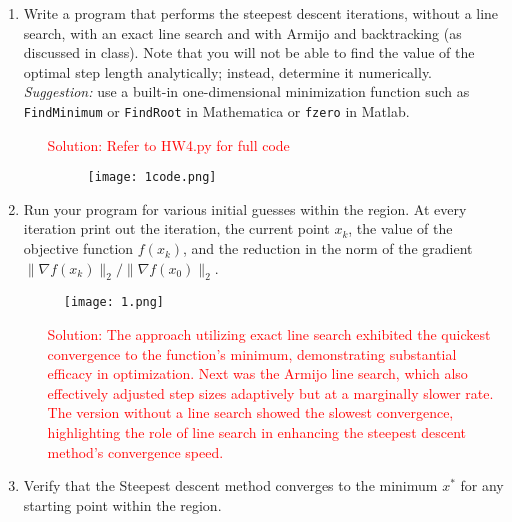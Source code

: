 \documentclass[11pt]{article}
\begin{document}
\begin{enumerate}
  
\item Write a program that performs the steepest descent iterations,
  without a line search, with an exact line search and with Armijo and
  backtracking (as discussed in class).  Note that you will not be
  able to find the value of the optimal step length analytically;
  instead, determine it numerically. {\em Suggestion:} use a built-in
  one-dimensional minimization function such as {\tt FindMinimum} or
  {\tt FindRoot} in {\sc Mathematica} or {\tt fzero} in {\sc Matlab}.



\begin{enumerate}
\item[\textcolor{red}{Solution:}]
\textcolor{red}{
Refer to HW4.py for full code
}

\begin{figure}[H]
\centering
\texttt{[image: 1code.png]} 
\end{figure}

\end{enumerate}






  
\item Run your program for various initial guesses within the region.
  At every iteration print out the
  iteration, the current point $x_k$, the value of the objective
  function $f(x_k)$, and the reduction in the norm of the gradient $ \|\nabla
  f(x_k)\|_2/ \|\nabla
  f(x_0)\|_2$.

    \begin{figure}[H]
    \centering
    \texttt{[image: 1.png]} 
    \end{figure}

\begin{enumerate}
\item[\textcolor{red}{Solution:}]
\textcolor{red}{
 The approach utilizing exact line search exhibited the quickest convergence to the function's minimum, demonstrating substantial efficacy in optimization. Next was the Armijo line search, which also effectively adjusted step sizes adaptively but at a marginally slower rate. The version without a line search showed the slowest convergence, highlighting the role of line search in enhancing the steepest descent method's convergence speed.
}
\end{enumerate}


  
\item Verify that the Steepest descent method converges to the minimum $x^*$
  for any starting point within the region.



\end{enumerate}
\end{document}
